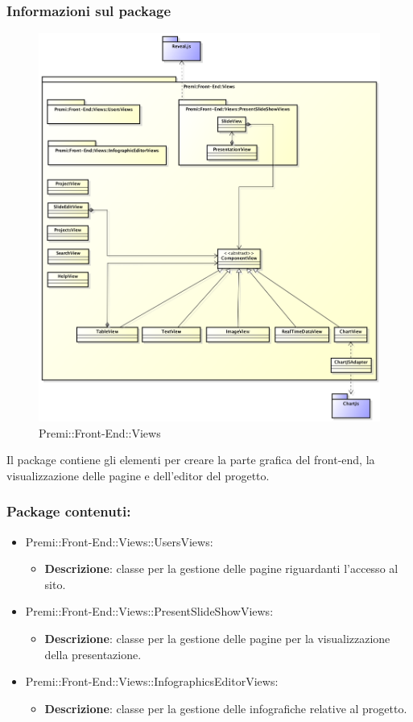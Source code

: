 	\subsubsection*{Informazioni sul package}
		\begin{figure}[h]
			\centering
			\includegraphics[width=0.7\linewidth]{img/front-end_views}
			\caption[Premi::Front-End::Views]{Premi::Front-End::Views}
		\end{figure}
		Il package contiene gli elementi per creare la parte grafica del \gls{front-end}, la visualizzazione delle pagine e dell'editor del progetto.

	\subsubsection*{Package contenuti:}

	\begin{itemize}
		\item Premi::Front-End::Views::UsersViews:
			\begin{itemize}
				\item \textbf{Descrizione}: classe per la gestione delle pagine riguardanti l'accesso al sito.
			\end{itemize}

		\item Premi::Front-End::Views::PresentSlideShowViews:
			\begin{itemize}
				\item \textbf{Descrizione}: classe per la gestione delle pagine per la visualizzazione della presentazione.
			\end{itemize}

		\item Premi::Front-End::Views::InfographicsEditorViews:
		\begin{itemize}
			\item \textbf{Descrizione}: classe per la gestione delle infografiche relative al progetto.
		\end{itemize}
	\end{itemize}

